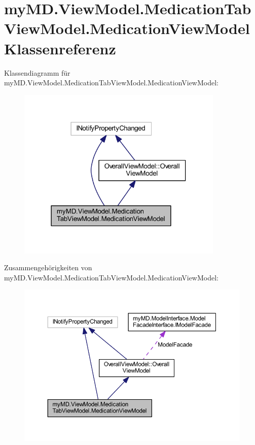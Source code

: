 \hypertarget{classmy_m_d_1_1_view_model_1_1_medication_tab_view_model_1_1_medication_view_model}{}\section{my\+M\+D.\+View\+Model.\+Medication\+Tab\+View\+Model.\+Medication\+View\+Model Klassenreferenz}
\label{classmy_m_d_1_1_view_model_1_1_medication_tab_view_model_1_1_medication_view_model}


Klassendiagramm für my\+M\+D.\+View\+Model.\+Medication\+Tab\+View\+Model.\+Medication\+View\+Model\+:\nopagebreak
\begin{figure}[H]
\begin{center}
\leavevmode
\includegraphics[width=279pt]{classmy_m_d_1_1_view_model_1_1_medication_tab_view_model_1_1_medication_view_model__inherit__graph}
\end{center}
\end{figure}


Zusammengehörigkeiten von my\+M\+D.\+View\+Model.\+Medication\+Tab\+View\+Model.\+Medication\+View\+Model\+:\nopagebreak
\begin{figure}[H]
\begin{center}
\leavevmode
\includegraphics[width=350pt]{classmy_m_d_1_1_view_model_1_1_medication_tab_view_model_1_1_medication_view_model__coll__graph}
\end{center}
\end{figure}
